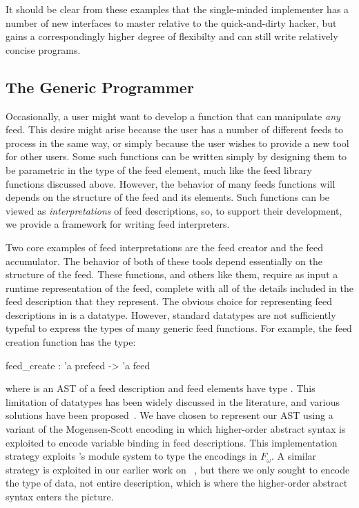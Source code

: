 It should be clear from these examples that the single-minded implementer
has a number of new interfaces to master relative to the quick-and-dirty
hacker, but gains a correspondingly higher degree of flexibilty and can
still write relatively concise programs.

\subsection{The Generic Programmer}


Occasionally, a user might want to develop a function that can
manipulate {\it any} feed. This desire might arise because the user
has a number of different feeds to process in the same way, or simply
because the user wishes to provide a new tool for other \padsd{}
users. Some such functions can be written simply by designing them to
be parametric in the type of the feed element, much like the feed
library functions discussed above. However, the behavior of many feeds
functions will depends on the structure of the feed and its
elements. Such functions can be viewed as {\it interpretations} of
feed descriptions, so, to support their development, we provide a
framework for writing feed interpreters.


Two core examples of feed interpretations are the feed creator and the
feed accumulator. The behavior of both of these tools depend
essentially on the structure of the feed. These functions, and others
like them, require as input a runtime representation of the feed,
complete with all of the details included in the feed description that
they represent. The obvious choice for representing feed descriptions
in \ocaml is a datatype. However, standard \ocaml datatypes are not
sufficiently typeful to express the types of many generic feed
functions. For example, the feed creation function has the type:
\begin{code}
feed_create : 'a prefeed -> 'a feed
\end{code} where  is an AST of a feed description and feed 
elements have type .
%
%
This limitation of datatypes has been widely discussed in the
literature, and various solutions have been 
proposed~\cite{yang:icfp98,weirich:encodingtypecase,hinz:icfp04,padsml-padl}. We have 
chosen to represent our AST using a variant of the Mogensen-Scott
encoding in which higher-order abstract syntax is exploited 
to encode variable binding in feed descriptions.  This implementation strategy 
exploits \ocaml's module system to type the encodings in $F_\omega$. 
A similar strategy is exploited in our earlier work on \padsml~\cite{padsml-padl}, 
but there we only sought to encode the \ocaml type of data, not entire \padsml
description, which is where the higher-order abstract syntax enters the picture.

